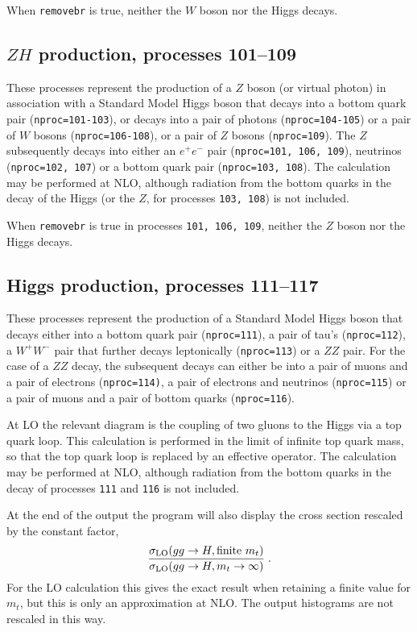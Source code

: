 \documentclass[12pt]{article}
\begin{document}
When {\tt removebr} is true, neither the $W$ boson nor the Higgs decays.

\subsection{$ZH$ production, processes 101--109}
\label{subsec:zh}

These processes represent the production of a $Z$ boson (or virtual photon)
in association with a Standard Model Higgs boson that
decays into a bottom quark pair ({\tt nproc=101-103}),
or decays into a pair of photons ({\tt nproc=104-105}) 
or a pair of $W$ bosons ({\tt nproc=106-108}),
or a pair of $Z$ bosons ({\tt nproc=109}). 
The $Z$ subsequently decays into 
either an $e^+ e^-$ pair ({\tt nproc=101, 106, 109}), neutrinos ({\tt nproc=102, 107})
or a bottom quark pair ({\tt nproc=103, 108}).
The calculation may be performed at NLO, although radiation from the
bottom quarks in the decay of the Higgs (or the $Z$, for processes
{\tt 103, 108}) is not included.

When {\tt removebr} is true in processes {\tt 101, 106, 109}, neither the $Z$ boson
nor the Higgs decays.

\subsection{Higgs production, processes 111--117}
\label{subsec:h}

These processes represent the production of a Standard Model Higgs
boson that decays either into a bottom quark
pair ({\tt nproc=111}), a pair of tau's ({\tt nproc=112}), a $W^+W^-$ pair
that further decays leptonically ({\tt nproc=113}) or a $ZZ$ pair.
For the case of a $ZZ$ decay,
the subsequent decays can either be into a pair of muons and a pair of electrons
({\tt nproc=114)}, a pair of electrons and neutrinos ({\tt nproc=115}) or
a pair of muons and a pair of bottom quarks ({\tt nproc=116}).

At LO the relevant diagram
is the coupling of two gluons to the Higgs via a top quark loop.
This calculation is performed in the limit of infinite top quark mass, so that 
the top quark loop is replaced by an effective operator.
The calculation may be performed at NLO, although radiation from the
bottom quarks in the decay of processes {\tt 111} and {\tt 116} is not included.

At the end of the output the program will also display the cross section rescaled
by the constant factor,
\begin{equation}
\frac{\sigma_{\rm LO}(gg \to H, \mbox{finite}~m_t)}{\sigma_{\rm LO}(gg \to H, m_t \to \infty)} \;.
\label{eqn:hrescale}
\end{equation}
For the LO calculation this gives the exact result when retaining a finite value for $m_t$,
but this is only an approximation at NLO. The output histograms are not rescaled in this way.
\end{document}
